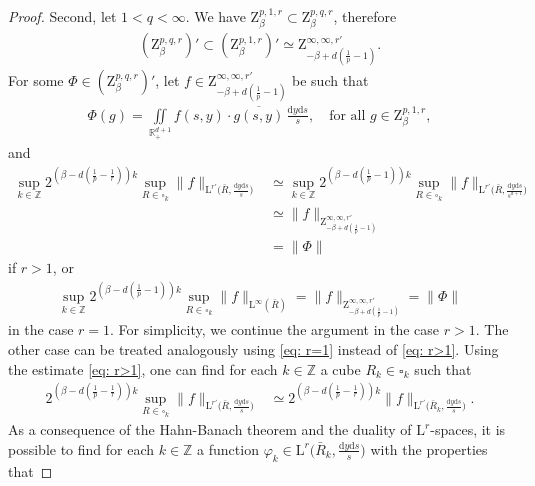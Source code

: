 \documentclass[11pt, leqno,parskip=half]{amsart}
\theoremstyle{definition}
\newcommand{\IR}{\mathbb{R}}
\newcommand{\IZ}{\mathbb{Z}}
\renewcommand{\L}{\mathrm{L}}
\newcommand{\Z}{\mathrm{Z}}
\renewcommand{\d}{\mathrm{d}}
\numberwithin{equation}{section}
\begin{document}
\begin{proof}
    \noindent Second, let $1< q <\infty$. We have $\Z^{p,1,r}_\beta\subset \Z^{p,q,r}_\beta$, therefore
    \begin{align*}
        (\Z^{p,q,r}_\beta)'\subset(\Z^{p,1,r}_\beta)' \simeq \Z^{\infty,\infty,r'}_{-\beta+d(\frac{1}{p}-1)}.
    \end{align*}
    For some $\Phi \in (\Z^{p,q,r}_\beta)'$, let $f\in \Z^{\infty,\infty,r'}_{-\beta+d(\frac{1}{p}-1)}$ be such that
    \begin{align}
    \label{eq: phi identity}
        \Phi(g) = \iint\limits_{\IR^{d+1}_+} f(s,y) \cdot \overline{g(s,y)} \,\frac{\d y \d s}{s},\quad \text{for all $g \in \Z^{p,1,r}_\beta$},
    \end{align}
    and
    \begin{align}
    \label{eq: r>1}
        \sup\limits_{k\in\IZ}2^{(\beta-d(\frac{1}{p}-\frac{1}{r}))k} \sup\limits_{R\in\square_k} \|f\|_{\L^{r'}\big(\bar R, \frac{\d y \d s}{s}\big)} &\simeq \sup\limits_{k\in\IZ}2^{(\beta-d(\frac{1}{p}-1))k} \sup\limits_{R\in\square_k} \|f\|_{\L^{r'}\big(\bar R, \frac{\d y \d s}{s^{d+1}}\big)} \nonumber\\
        &\simeq \|f\|_{\Z^{\infty,\infty,r'}_{-\beta+d(\frac{1}{p}-1)}}\\
        &= \|\Phi\|\nonumber
    \end{align}
    if $r>1$, or
    \begin{align}
    \label{eq: r=1}
        \sup\limits_{k\in\IZ}2^{(\beta-d(\frac{1}{p}-1))k} \sup\limits_{R\in\square_k} \|f\|_{\L^{\infty}(\bar R)} = \|f\|_{\Z^{\infty,\infty,r'}_{-\beta+d(\frac{1}{p}-1)}} = \|\Phi\|
    \end{align}
    in the case $r=1$. For simplicity, we continue the argument in the case $r>1$. The other case can be treated analogously using \eqref{eq: r=1} instead of \eqref{eq: r>1}.
    Using the estimate \eqref{eq: r>1}, one can find for each $k\in\IZ$ a cube $R_k\in \square_k$ such that
    \begin{align}
    \label{eq: compare sup with pointwise}
         2^{(\beta-d(\frac{1}{p}-\frac{1}{r}))k} \sup\limits_{R\in\square_k} \|f\|_{\L^{r'}\big(\bar R, \frac{\d y \d s}{s}\big)}
        &\simeq 2^{(\beta-d(\frac{1}{p}-\frac{1}{r}))k} \|f\|_{\L^{r'}\big(\bar R_k, \frac{\d y \d s}{s}\big)}.
    \end{align}
    As a consequence of the Hahn-Banach theorem and the duality of $\L^r$-spaces, it is possible to find for each $k\in\IZ$ a function $\varphi_k\in \L^{r}\big(\bar R_k, \frac{\d y \d s}{s}\big)$ with the properties that

\end{proof}
\end{document}
